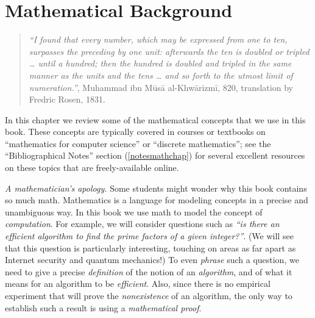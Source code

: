 \chapter{Mathematical Background}\label{chapmath}


\begin{quote}
\emph{``I found that every number, which may be expressed from one to
ten, surpasses the preceding by one unit: afterwards the ten is doubled
or tripled \ldots{} until a hundred; then the hundred is doubled and
tripled in the same manner as the units and the tens \ldots{} and so
forth to the utmost limit of numeration.''}, Muhammad ibn Mūsā
al-Khwārizmī, 820, translation by Fredric Rosen, 1831.
\end{quote}

In this chapter we review some of the mathematical concepts that we use
in this book. These concepts are typically covered in courses or
textbooks on ``mathematics for computer science'' or ``discrete
mathematics''; see the ``Bibliographical Notes'' section
(\cref{notesmathchap}) for several excellent resources on these topics
that are freely-available online.

\emph{A mathematician's apology.} Some students might wonder why this
book contains so much math. Mathematics is a language for modeling
concepts in a precise and unambiguous way. In this book we use math to
model the concept of \emph{computation}. For example, we will consider
questions such as \emph{``is there an efficient algorithm to find the
prime factors of a given integer?''}. (We will see that this question is
particularly interesting, touching on areas as far apart as Internet
security and quantum mechanics!) To even \emph{phrase} such a question,
we need to give a precise \emph{definition} of the notion of an
\emph{algorithm}, and of what it means for an algorithm to be
\emph{efficient}. Also, since there is no empirical experiment that will
prove the \emph{nonexistence} of an algorithm, the only way to establish
such a result is using a \emph{mathematical proof}.

